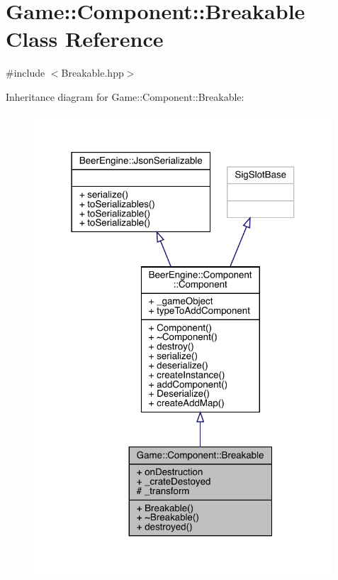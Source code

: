\hypertarget{class_game_1_1_component_1_1_breakable}{}\section{Game\+:\+:Component\+:\+:Breakable Class Reference}
\label{class_game_1_1_component_1_1_breakable}


{\ttfamily \#include $<$Breakable.\+hpp$>$}



Inheritance diagram for Game\+:\+:Component\+:\+:Breakable\+:\nopagebreak
\begin{figure}[H]
\begin{center}
\leavevmode
\includegraphics[width=316pt]{class_game_1_1_component_1_1_breakable__inherit__graph}
\end{center}
\end{figure}



